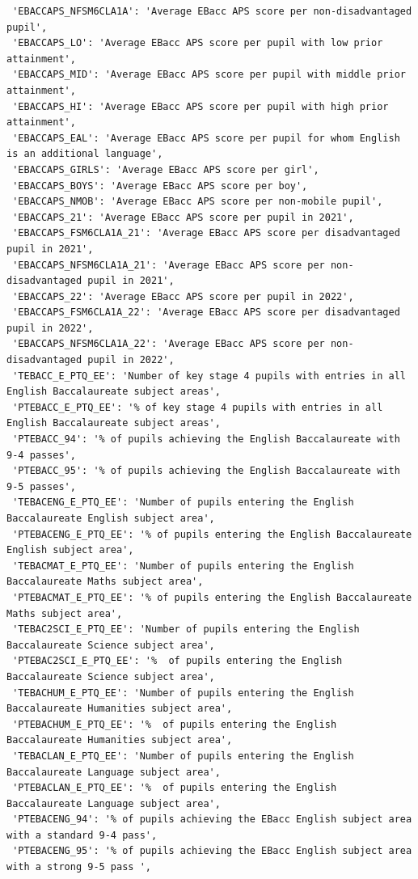 \documentclass[
  letterpaper,
  DIV=11,
  numbers=noendperiod]{scrartcl}
\begin{document}
\begin{verbatim}
 'EBACCAPS_NFSM6CLA1A': 'Average EBacc APS score per non-disadvantaged pupil',
 'EBACCAPS_LO': 'Average EBacc APS score per pupil with low prior attainment',
 'EBACCAPS_MID': 'Average EBacc APS score per pupil with middle prior attainment',
 'EBACCAPS_HI': 'Average EBacc APS score per pupil with high prior attainment',
 'EBACCAPS_EAL': 'Average EBacc APS score per pupil for whom English is an additional language',
 'EBACCAPS_GIRLS': 'Average EBacc APS score per girl',
 'EBACCAPS_BOYS': 'Average EBacc APS score per boy',
 'EBACCAPS_NMOB': 'Average EBacc APS score per non-mobile pupil',
 'EBACCAPS_21': 'Average EBacc APS score per pupil in 2021',
 'EBACCAPS_FSM6CLA1A_21': 'Average EBacc APS score per disadvantaged pupil in 2021',
 'EBACCAPS_NFSM6CLA1A_21': 'Average EBacc APS score per non-disadvantaged pupil in 2021',
 'EBACCAPS_22': 'Average EBacc APS score per pupil in 2022',
 'EBACCAPS_FSM6CLA1A_22': 'Average EBacc APS score per disadvantaged pupil in 2022',
 'EBACCAPS_NFSM6CLA1A_22': 'Average EBacc APS score per non-disadvantaged pupil in 2022',
 'TEBACC_E_PTQ_EE': 'Number of key stage 4 pupils with entries in all English Baccalaureate subject areas',
 'PTEBACC_E_PTQ_EE': '% of key stage 4 pupils with entries in all English Baccalaureate subject areas',
 'PTEBACC_94': '% of pupils achieving the English Baccalaureate with 9-4 passes',
 'PTEBACC_95': '% of pupils achieving the English Baccalaureate with 9-5 passes',
 'TEBACENG_E_PTQ_EE': 'Number of pupils entering the English Baccalaureate English subject area',
 'PTEBACENG_E_PTQ_EE': '% of pupils entering the English Baccalaureate English subject area',
 'TEBACMAT_E_PTQ_EE': 'Number of pupils entering the English Baccalaureate Maths subject area',
 'PTEBACMAT_E_PTQ_EE': '% of pupils entering the English Baccalaureate Maths subject area',
 'TEBAC2SCI_E_PTQ_EE': 'Number of pupils entering the English Baccalaureate Science subject area',
 'PTEBAC2SCI_E_PTQ_EE': '%  of pupils entering the English Baccalaureate Science subject area',
 'TEBACHUM_E_PTQ_EE': 'Number of pupils entering the English Baccalaureate Humanities subject area',
 'PTEBACHUM_E_PTQ_EE': '%  of pupils entering the English Baccalaureate Humanities subject area',
 'TEBACLAN_E_PTQ_EE': 'Number of pupils entering the English Baccalaureate Language subject area',
 'PTEBACLAN_E_PTQ_EE': '%  of pupils entering the English Baccalaureate Language subject area',
 'PTEBACENG_94': '% of pupils achieving the EBacc English subject area with a standard 9-4 pass',
 'PTEBACENG_95': '% of pupils achieving the EBacc English subject area with a strong 9-5 pass ',

\end{verbatim}
\end{document}

